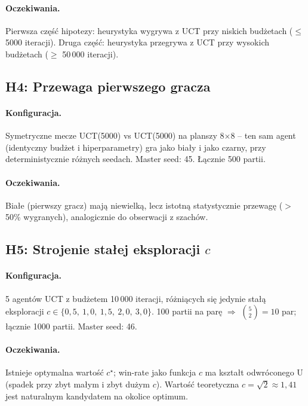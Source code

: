 \paragraph{Oczekiwania.}
Pierwsza część hipotezy: heurystyka wygrywa z UCT przy niskich budżetach
($\leq$ 5000 iteracji).
Druga część: heurystyka przegrywa z UCT przy wysokich budżetach
($\geq$ 50\,000 iteracji).

\subsection{H4: Przewaga pierwszego gracza}

\paragraph{Konfiguracja.}
Symetryczne mecze UCT(5000) vs UCT(5000) na planszy 8$\times$8 -- ten sam
agent (identyczny budżet i hiperparametry) gra jako biały i jako czarny,
przy deterministycznie różnych seedach. Master seed: 45. Łącznie 500 partii.

\paragraph{Oczekiwania.}
Białe (pierwszy gracz) mają niewielką, lecz istotną statystycznie przewagę
($>$ 50\% wygranych), analogicznie do obserwacji z szachów.

\subsection{H5: Strojenie stałej eksploracji $c$}

\paragraph{Konfiguracja.}
5 agentów UCT z budżetem 10\,000 iteracji, różniących się jedynie stałą
eksploracji $c \in \{0{,}5,\ 1{,}0,\ 1{,}5,\ 2{,}0,\ 3{,}0\}$. 100 partii na parę $\Rightarrow$ $\binom{5}{2} = 10$ par;
łącznie 1000 partii. Master seed: 46.

\paragraph{Oczekiwania.}
Istnieje optymalna wartość $c^\star$; win-rate jako funkcja $c$ ma kształt
odwróconego U (spadek przy zbyt małym i zbyt dużym $c$). Wartość teoretyczna
$c = \sqrt{2} \approx 1{,}41$ jest naturalnym kandydatem na okolice optimum.

